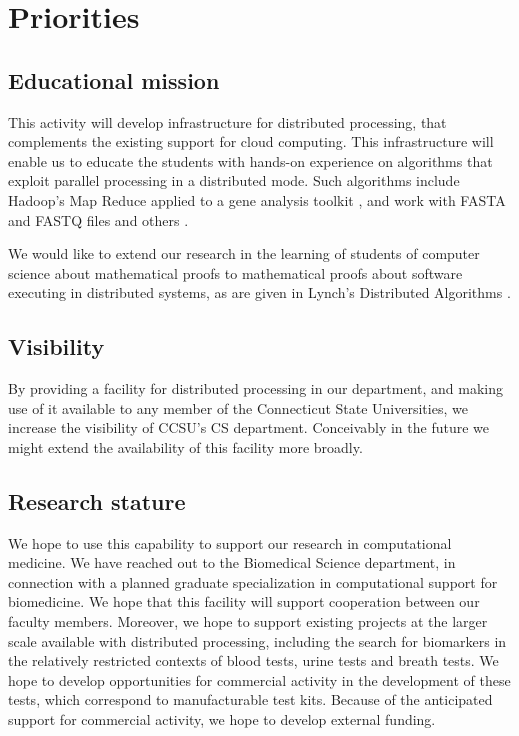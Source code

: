 \documentclass[]{article}
\title{}
\author{}
\begin{document}
\maketitle



\section{Priorities}
\subsection{Educational mission}
This activity will  develop infrastructure for distributed processing, that complements the existing support for cloud computing. This infrastructure will enable us to educate the students with hands-on experience on algorithms that exploit parallel processing in a distributed mode. Such algorithms include Hadoop's Map Reduce applied to a gene analysis toolkit \cite{mckenna2010genome,taylor2010overview}, and work with FASTA and FASTQ files \cite{ferraro2017fastdoop} and others \cite{cattaneo2016mapreduce}.

We would like to extend our research in the learning of students of computer science about mathematical proofs \cite{smith2013mathematization,smith2014computer,smith2016categories} to mathematical proofs about software executing in distributed systems, as are given in Lynch's Distributed Algorithms \cite{lynch1996distributed}.
\subsection{Visibility}
By providing a facility for distributed processing in our department, and making use of it available to any member of the Connecticut State Universities, we increase the visibility of CCSU's CS department. Conceivably in the future we might extend the availability of this facility more broadly.
\subsection{Research stature}
We hope to use this capability to support our research in computational medicine. We have reached out to the Biomedical Science department, in connection with a planned graduate specialization in computational support for biomedicine. We hope that this facility will support cooperation between our faculty members. Moreover, we hope to support existing projects at the larger scale available with distributed processing, including the search for biomarkers in the relatively restricted contexts of blood tests, urine tests and breath tests. We hope to develop opportunities for commercial activity in the development of these tests, which correspond to manufacturable test kits. Because of the anticipated support for commercial activity, we hope to develop external funding.
\end{document}
